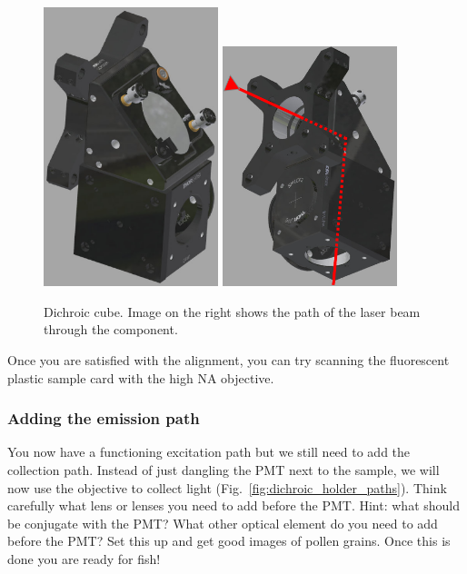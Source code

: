 \documentclass[a4paper]{report}
\begin{document}
\begin{figure}[h]
\center
\includegraphics[width=2.0in]{dichroic_cube.eps}
\includegraphics[width=2.0in]{laser_path_through_cube.eps}
\caption{Dichroic cube. Image on the right shows the path of the laser beam through the component.}
\label{fig:dichroic_holder}
\end{figure}

Once you are satisfied with the alignment, you can try scanning the fluorescent plastic sample card with the high NA objective. 

\subsubsection{Adding the emission path}
You now have a functioning excitation path but we still need to add the collection path. 
Instead of just dangling the PMT next to the sample, we will now use the objective to collect light (Fig.~\ref{fig:dichroic_holder_paths}). 
Think carefully what lens or lenses you need to add before the PMT. 
Hint: what should be conjugate with the PMT?
What other optical element do you need to add before the PMT?
Set this up and get good images of pollen grains. 
Once this is done you are ready for fish!
\end{document}
